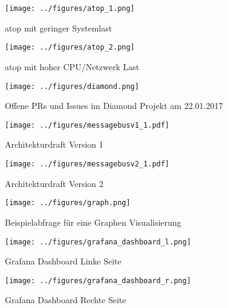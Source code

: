 \begin{figure}[tbph]
  \centering
  \texttt{[image: ../figures/atop\_1.png]}
  \caption{atop mit geringer Systemlast}
\label{figure:atop1}
\end{figure}

\begin{figure}[tbp]
  \centering
  \texttt{[image: ../figures/atop\_2.png]}
  \caption{atop mit hoher CPU/Netzwerk Last}
\label{figure:atop2}
\end{figure}

\begin{figure}[tbp]
  \centering
  \texttt{[image: ../figures/diamond.png]}
  \caption{Offene PRs und Issues im Diamond Projekt am 22.01.2017}
\label{figure:diamond}
\end{figure}

\begin{figure}[tbp]
  \centering
  \texttt{[image: ../figures/messagebusv1\_1.pdf]}
  \caption{Architekturdraft Version 1}
\label{figure:draft1}
\end{figure}
\begin{figure}[tbp]
  \centering
  \texttt{[image: ../figures/messagebusv2\_1.pdf]}
  \caption{Architekturdraft Version 2}
\label{figure:draft2}
\end{figure}
\FloatBarrier{}

\begin{figure}[tbp]
  \centering
  \texttt{[image: ../figures/graph.png]}
  \caption{Beispielabfrage für eine Graphen Visualisierung}
\label{figure:graph}
\end{figure}

\begin{figure}[tbp]
  \centering
  \texttt{[image: ../figures/grafana\_dashboard\_l.png]}
  \caption{Grafana Dashboard Linke Seite}
\label{figure:grafana_dashboard_l}
\end{figure}

\begin{figure}[tbp]
  \centering
  \texttt{[image: ../figures/grafana\_dashboard\_r.png]}
  \caption{Grafana Dashboard Rechte Seite}
\label{figure:grafana_dashboard_r}
\end{figure}


